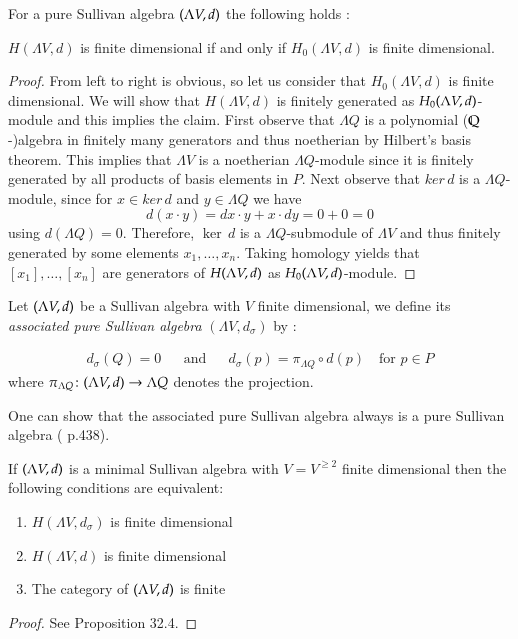 \begin{Proposition}
\label{prop:FiniteDimensionDependentOnDegreeOne}
 For a pure Sullivan algebra $(\Lambda V,d)$ the following holds :
 
  $H(\Lambda V,d)$ is finite dimensional if and only if $H_0(\Lambda V,d)$ is finite dimensional.
 
\end{Proposition}

\begin{proof}
 From left to right is obvious, so let us consider that $H_0(\Lambda V,d)$ is finite dimensional.
 We will show that $H(\Lambda V, d)$ is finitely generated as $H_0 (\Lambda V,d)$-module and this implies the claim.
 First observe that $\Lambda Q$ is a polynomial ($\mathbb{Q}$-)algebra in finitely many generators and thus noetherian by
 Hilbert's basis theorem. This implies that $\Lambda V$ is a noetherian $\Lambda Q$-module since it is 
 finitely generated by all products of basis elements in $ P$. Next observe that
 $ker \, d$ is a $\Lambda Q$-module, since for $x \in ker \, d$ and  $y \in \Lambda Q$ we have
 $$ d(x \cdot y) = dx \cdot y + x \cdot dy = 0 + 0 = 0$$
 using $d(\Lambda Q) = 0$. Therefore, $\ker \, d$ is a $\Lambda Q$-submodule of $\Lambda V$ and thus 
 finitely generated by some elements $x_1, \ldots, x_n$. Taking homology yields that $[x_1], \ldots, [x_n]$
 are generators of $H (\Lambda V,d)$ as $H_0 (\Lambda V,d)$-module.
\end{proof}

\begin{Definition}
 Let $(\Lambda V,d)$ be a Sullivan algebra with $V$ finite dimensional, we define its 
 \emph{associated pure Sullivan algebra} $(\Lambda V, d_{\sigma})$ by :
 
 \begin{align*}
  d_{\sigma} (Q) = 0 & & \text{and} & & d_{\sigma}(p) = \pi_{\Lambda Q} \circ d(p) \quad \text{for $p \in P$}
 \end{align*}
 where $\pi_{\Lambda Q} \colon (\Lambda V,d) \to \Lambda Q$ denotes the projection.
 \end{Definition}

 One can show that the associated pure Sullivan algebra always is a pure Sullivan algebra ( \cite{Felix2001} p.438).

\begin{Proposition}
\label{prop:EquivalenceFiniteDimensionCategoryCohomology}
 If $(\Lambda V,d)$ is a minimal Sullivan algebra with $V = V^{\geq 2}$ finite dimensional then the following conditions
 are equivalent:
 
 \begin{enumerate}
  \item $H(\Lambda V, d_{\sigma})$ is finite dimensional
  \item $H(\Lambda V, d)$ is finite dimensional
  \item The category of $(\Lambda V,d)$ is finite
 \end{enumerate}

\end{Proposition}

\begin{proof}
 See \cite{Felix2001} Proposition 32.4.
\end{proof}

